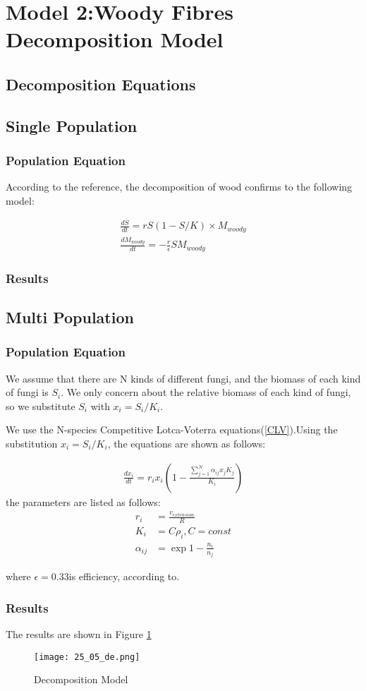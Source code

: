 \section{Model 2:Woody Fibres Decomposition Model}
	\subsection{Decomposition Equations}
	\subsection{Single Population}
		\subsubsection{Population Equation}
		According to the reference\cite{2}, the decomposition of wood confirms to the following model:

\begin{align}
    \frac{dS}{dt}=rS(1-S/K)\times M_{woody}\\
    \frac{dM_{woody}}{dt}=-\frac{r}{\epsilon}SM_{woody}
\end{align}
		\subsubsection{Results}
	\subsection{Multi Population}
		\subsubsection{Population Equation}
We assume that there are N kinds of different fungi, and the biomass of each kind of fungi is $S_i$. We only concern about the relative biomass of each kind of fungi, so we substitute $S_i$ with $x_i=S_i/K_i$.

We use the N-species Competitive Lotca-Voterra equations(\ref{CLV}).Using the substitution $x_i=S_i/K_i$, the equations are shown as follows:

\begin{align}
    \frac{dx_i}{dt}=r_i x_i  (1- \frac{\sum_{j=1}^{N}\alpha_{ij}x_jK_j}{K_i})
\end{align}
the parameters are listed as follows:
\begin{align}
    r_i&=\frac{v_{extension}}{R}\\
    K_i&=C\rho_i,C=const\\
    \alpha_{ij}&=\exp{1-\frac{n_i}{n_j}}
\end{align}

where $\epsilon=0.33$is efficiency, according to\cite{2}.

		\subsubsection{Results}


The results are shown in Figure \ref{fig:result}

\begin{figure}[H]
	\centering
	\texttt{[image: 25\_05\_de.png]}
	\caption{Decomposition Model}\label{fig:result}
\end{figure}
